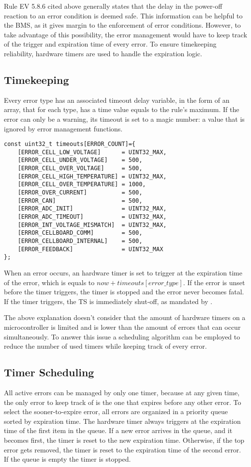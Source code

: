 Rule EV 5.8.6 cited above generally states that the delay in the power-off reaction to an error condition is deemed safe. This information can be helpful to the BMS, as it gives margin to the enforcement of error conditions. However, to take advantage of this possibility, the error management would have to keep track of the trigger and expiration time of every error. To ensure timekeeping reliability, hardware timers are used to handle the expiration logic.

\subsection{Timekeeping}
Every error type has an associated timeout delay variable, in the form of an array, that for each type, has a time value equals to the rule's maximum. If the error can only be a warning, its timeout is set to a magic number: a value that is ignored by error management functions.

\begin{verbatim}
const uint32_t timeouts[ERROR_COUNT]={
	[ERROR_CELL_LOW_VOLTAGE]      = UINT32_MAX,
	[ERROR_CELL_UNDER_VOLTAGE]    = 500,
	[ERROR_CELL_OVER_VOLTAGE]     = 500,
	[ERROR_CELL_HIGH_TEMPERATURE] = UINT32_MAX,
	[ERROR_CELL_OVER_TEMPERATURE] = 1000,
	[ERROR_OVER_CURRENT]          = 500,
	[ERROR_CAN]                   = 500,
	[ERROR_ADC_INIT]              = UINT32_MAX,
	[ERROR_ADC_TIMEOUT]           = UINT32_MAX,
	[ERROR_INT_VOLTAGE_MISMATCH]  = UINT32_MAX,
	[ERROR_CELLBOARD_COMM]        = 500,
	[ERROR_CELLBOARD_INTERNAL]    = 500,
	[ERROR_FEEDBACK]              = UINT32_MAX
};
\end{verbatim}

When an error occurs, an hardware timer is set to trigger at the expiration time of the error, which is equals to $now + timeouts[error\_type]$. If the error is unset before the timer triggers, the timer is stopped and the error never becomes fatal. If the timer triggers, the TS is immediately shut-off, as mandated by \cite[EV 5.8.6]{fsg2020}.

The above explanation doesn't consider that the amount of hardware timers on a microcontroller is limited and is lower than the amount of errors that can occur simultaneously. To answer this issue a scheduling algorithm can be employed to reduce the number of used timers while keeping track of every error.

\subsection{Timer Scheduling}
All active errors can be managed by only one timer, because at any given time, the only error to keep track of is the one that expires before any other error.
To select the sooner-to-expire error, all errors are organized in a priority queue sorted by expiration time. The hardware timer always triggers at the expiration time of the first item in the queue. If a new error arrives in the queue, and it becomes first, the timer is reset to the new expiration time. Otherwise, if the top error gets removed, the timer is reset to the expiration time of the second error. If the queue is empty the timer is stopped.

